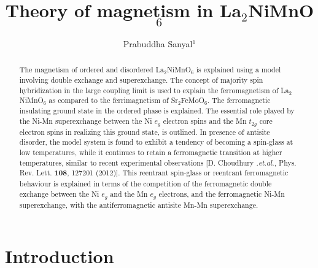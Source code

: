 \documentclass[english,aps,prb,twocolumn,showpacs]{revtex4-1}
\begin{document}
\title{Theory of magnetism in La$_2$NiMnO$_6$}
\author{Prabuddha Sanyal$^{1}$} 



\begin{abstract}
The magnetism of ordered and disordered La$_2$NiMnO$_6$ is explained using a model involving
double exchange and superexchange. 
 The concept of majority spin hybridization in the large
  coupling limit is used to explain the ferromagnetism of La$_2$NiMnO$_6$ as compared to
 the ferrimagnetism of Sr$_{2}$FeMoO$_{6}$.
 The ferromagnetic insulating ground state in the ordered phase is explained. The essential role played by the 
 Ni-Mn superexchange between the Ni $e_{g}$ electron spins and the Mn $t_{2g}$ core electron spins 
 in realizing this ground state, is outlined.
 In presence of antisite disorder, the model system is found to exhibit a tendency of
  becoming a spin-glass at low temperatures,
 while it continues to retain a ferromagnetic transition at higher temperatures, similar to recent
 experimental observations [D. Choudhury {\it .et.al.}, Phys. Rev. Lett. {\bf 108}, 127201 (2012)].
 This reentrant spin-glass or reentrant ferromagnetic behaviour is explained 
 in terms of the competition of the ferromagnetic double exchange
 between the Ni $e_{g}$ and the Mn $e_{g}$ electrons, and the ferromagnetic Ni-Mn superexchange, with the
 antiferromagnetic antisite Mn-Mn superexchange.  
\end{abstract}


\maketitle


\section{Introduction}
\end{document}
